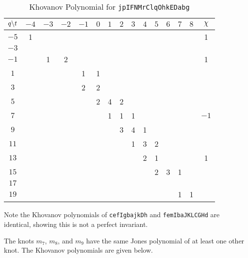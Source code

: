     \begin{table}
        \centering
        \begin{tabular}{| c | c | c | c | c | c | c | c | c | c | c | c | c | c | c |}
            \hline
            $q\symbol{92}t$&$-4$&$-3$&$-2$&$-1$&$0$&$1$&$2$&$3$&$4$&$5$&$6$&$7$&$8$&$\chi$\\
            \hline
            $-5$&1&&&&&&&&&&&&&1\\
            \hline
            $-3$&&&&&&&&&&&&&&\\
            \hline
            $-1$&&1&2&&&&&&&&&&&1\\
            \hline
            $1$&&&&1&1&&&&&&&&&\\
            \hline
            $3$&&&&2&2&&&&&&&&&\\
            \hline
            $5$&&&&&2&4&2&&&&&&&\\
            \hline
            $7$&&&&&&1&1&1&&&&&&$-1$\\
            \hline
            $9$&&&&&&&3&4&1&&&&&\\
            \hline
            $11$&&&&&&&&1&3&2&&&&\\
            \hline
            $13$&&&&&&&&&2&1&&&&1\\
            \hline
            $15$&&&&&&&&&&2&3&1&&\\
            \hline
            $17$&&&&&&&&&&&&&&\\
            \hline
            $19$&&&&&&&&&&&&1&1&\\
            \hline
        \end{tabular}
        \caption{Khovanov Polynomial for \texttt{jpIFNMrClqOhkEDabg}}
        \label{table:jpIFNMrClqOhkEDabg_kho}
    \end{table}
    Note the Khovanov polynomials of \texttt{cefIgbajkDh} and
    \texttt{femIbaJKLCGHd} are identical, showing this is not a perfect
    invariant.
    \par\hfill\par
    The knots $m_{7}$, $m_{8}$, and $m_{9}$ have the same Jones polynomial
    of at least one other knot. The Khovanov polynomials are given below.
